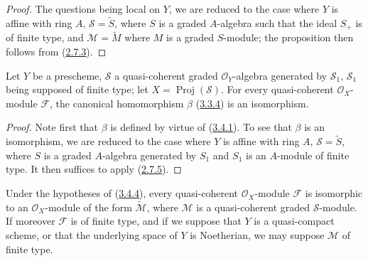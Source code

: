 \begin{proof}
The questions being local on $Y$, we are reduced to the case where $Y$ is
affine with ring $A$, $\mathcal{S}=\widetilde{S}$, where $S$ is a graded
$A$-algebra such that the ideal $S_+$ is of finite type, and
$\mathcal{M}=\widetilde{M}$ where $M$ is a graded $S$-module; the proposition
then follows from (\hyperref[II.2.7.3]{2.7.3}).
\end{proof}

\begin{theorem}[3.4.4]
\label{II.3.4.4}
Let $Y$ be a prescheme, $\mathcal{S}$ a quasi-coherent graded
$\mathcal{O}_Y$-algebra generated by $\mathcal{S}_1$, $\mathcal{S}_1$ being
supposed of finite type; let $X=\operatorname{Proj}(\mathcal{S})$. For every
quasi-coherent $\mathcal{O}_X$-module $\mathcal{F}$, the canonical homomorphism
$\beta$ (\hyperref[II.3.3.4]{3.3.4}) is an isomorphism.
\end{theorem}

\begin{proof}
Note first that $\beta$ is defined by virtue of
(\hyperref[II.3.4.1]{3.4.1}). To see that $\beta$ is an isomorphism,
we are reduced to the case where $Y$ is affine with ring $A$,
$\mathcal{S}=\widetilde{S}$, where $S$ is a graded $A$-algebra generated by
$S_1$ and $S_1$ is an $A$-module of finite type. It then suffices to apply
(\hyperref[II.2.7.5]{2.7.5}).
\end{proof}

\begin{corollary}[3.4.5]
\label{II.3.4.5}
Under the hypotheses of (\hyperref[II.3.4.4]{3.4.4}), every
quasi-coherent $\mathcal{O}_X$-module $\mathcal{F}$ is isomorphic to an
$\mathcal{O}_X$-module of the form $\widetilde{\mathcal{M}}$, where
$\mathcal{M}$ is a quasi-coherent graded $\mathcal{S}$-module. If moreover
$\mathcal{F}$ is of finite type, and if we suppose that $Y$ is a quasi-compact
scheme, or that the underlying space of $Y$ is Noetherian, we may
suppose $\mathcal{M}$ of finite type.
\end{corollary}


